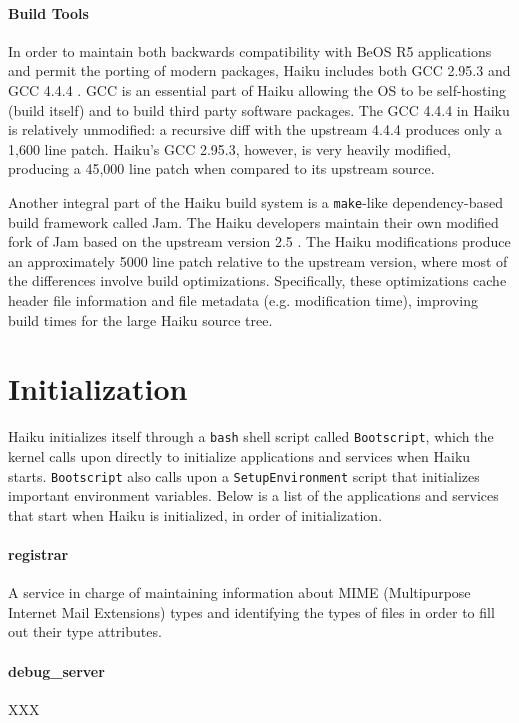 \documentclass{article}
\begin{document}
\paragraph{Build Tools}
In order to maintain both backwards compatibility with BeOS R5
applications and permit the porting of modern packages, Haiku includes
both GCC 2.95.3 and GCC 4.4.4 \cite{GCCHybrids}.  GCC is an essential
part of Haiku allowing the OS to be self-hosting (build itself) and to
build third party software packages.  The GCC 4.4.4 in Haiku is
relatively unmodified: a recursive diff with the upstream 4.4.4
produces only a 1,600 line patch.  Haiku's GCC 2.95.3, however, is
very heavily modified, producing a 45,000 line patch when compared to
its upstream source.

Another integral part of the Haiku build system is a \texttt{make}-like
dependency-based build framework called Jam.  The Haiku developers
maintain their own modified fork of Jam based on the upstream version
2.5 \cite{UsingJam}.  The Haiku modifications produce an approximately
5000 line patch relative to the upstream version, where most of the
differences involve build optimizations.  Specifically, these
optimizations cache header file information and file metadata
(e.g. modification time), improving build times for the large Haiku
source tree.

\section{Initialization}

Haiku initializes itself through a \texttt{bash} shell script
called \texttt{Bootscript}, which the kernel calls upon directly to
initialize applications and services when Haiku
starts. \texttt{Bootscript} also calls upon
a \texttt{SetupEnvironment} script that initializes important
environment variables. Below is a list of the applications and
services that start when Haiku is initialized, in order of
initialization.

\paragraph{registrar}
A service in charge of maintaining information about MIME
(Multipurpose Internet Mail Extensions) types and identifying the
types of files in order to fill out their type
attributes. \cite{RegistrarInfo}

\paragraph{debug\_server}
XXX
\end{document}
